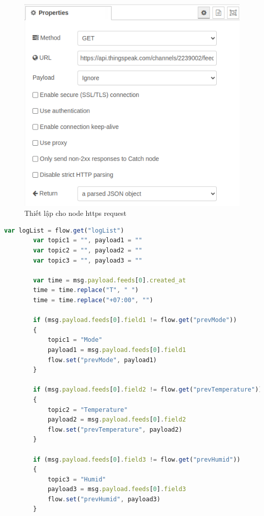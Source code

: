 \documentclass{report}
\begin{document}
\begin{enumerate}
    \begin{figure}[H]
        \includegraphics[width=\textwidth, keepaspectratio]{img/flow/configure_request.png}
        \centering
        \caption{Thiết lập cho node https request}
    \end{figure}

    \pagebreak
    \begin{lstlisting}[language=JavaScript, caption={function of control log list}]
        var logList = flow.get("logList")
        var topic1 = "", payload1 = ""
        var topic2 = "", payload2 = ""
        var topic3 = "", payload3 = ""

        var time = msg.payload.feeds[0].created_at
        time = time.replace("T", " ")
        time = time.replace("+07:00", "")

        if (msg.payload.feeds[0].field1 != flow.get("prevMode"))
        {
            topic1 = "Mode"
            payload1 = msg.payload.feeds[0].field1
            flow.set("prevMode", payload1)
        }

        if (msg.payload.feeds[0].field2 != flow.get("prevTemperature")) 
        {
            topic2 = "Temperature"
            payload2 = msg.payload.feeds[0].field2
            flow.set("prevTemperature", payload2)
        }

        if (msg.payload.feeds[0].field3 != flow.get("prevHumid")) 
        {
            topic3 = "Humid"
            payload3 = msg.payload.feeds[0].field3
            flow.set("prevHumid", payload3)
        }


\end{lstlisting}
\end{enumerate}
\end{document}

